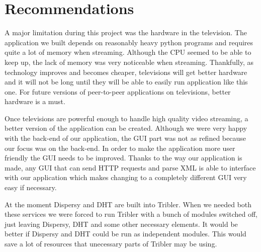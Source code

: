 \chapter{Recommendations}
\label{sec:recommendations}

A major limitation during this project was the hardware in the television. The application we built depends on reasonably heavy python programs and requires quite a lot of memory when streaming. Although the CPU seemed to be able to keep up, the lack of memory was very noticeable when streaming. Thankfully, as technology improves and becomes cheaper, televisions will get better hardware and it will not be long until they will be able to easily run application like this one. For future versions of peer-to-peer applications on televisions, better hardware is a must.

Once televisions are powerful enough to handle high quality video streaming, a better version of the application can be created. Although we were very happy with the back-end of our application, the GUI part was not as refined because our focus was on the back-end. In order to make the application more user friendly the GUI needs to be improved. Thanks to the way our application is made, any GUI that can send HTTP requests and parse XML is able to interface with our application which makes changing to a completely different GUI very easy if necessary.

At the moment Dispersy and DHT are built into Tribler. When we needed both these services we were forced to run Tribler with a bunch of modules switched off, just leaving Dispersy, DHT and some other necessary elements. It would be better if Dispersy and DHT could be run as independent modules. This would save a lot of resources that unecessary parts of Tribler may be using.
